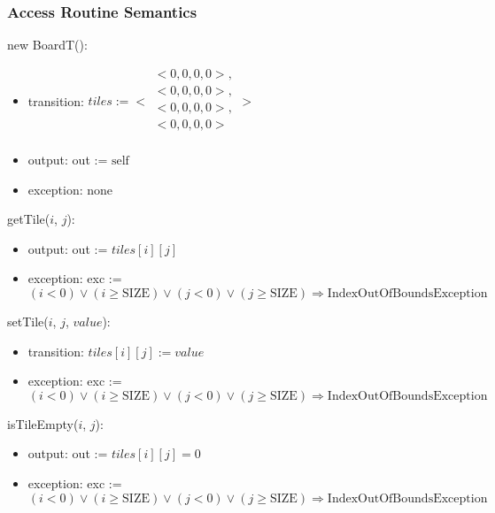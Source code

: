 \documentclass[12pt]{article}
\begin{document}
\newpage

\subsubsection* {Access Routine Semantics}

\noindent new BoardT():
\begin{itemize}
\item transition: 
$ tiles :=
< \begin{array}{lr}
< \mbox{0}, \mbox{0}, \mbox{0}, \mbox{0} >,\\
< \mbox{0}, \mbox{0}, \mbox{0}, \mbox{0} >, \\
< \mbox{0}, \mbox{0}, \mbox{0}, \mbox{0} >, \\
< \mbox{0}, \mbox{0}, \mbox{0}, \mbox{0} >\\
\end{array} >
$

\item output: out := $\mbox{self}$
\item exception: none
\end{itemize}

\noindent getTile($i$, $j$):
\begin{itemize}
\item output: out := $tiles[i][j]$
\item exception: exc := $(\mathit{i} < 0) \vee (\mathit{i} \geq \text{SIZE}) \vee (\mathit{j} < 0) \vee (\mathit{j} \geq \text{SIZE})\Rightarrow \text{IndexOutOfBoundsException}$
\end{itemize}

\noindent setTile($i$, $j$, $value$):
\begin{itemize}
\item transition: $tiles[i][j] := value$
\item exception: exc := $(\mathit{i} < 0) \vee (\mathit{i} \geq \text{SIZE}) \vee (\mathit{j} < 0) \vee (\mathit{j} \geq \text{SIZE})\Rightarrow \text{IndexOutOfBoundsException}$
\end{itemize}

\noindent isTileEmpty($i$, $j$):
\begin{itemize}
\item output: out := $tiles[i][j] = 0$
\item exception: exc := $(\mathit{i} < 0) \vee (\mathit{i} \geq \text{SIZE}) \vee (\mathit{j} < 0) \vee (\mathit{j} \geq \text{SIZE})\Rightarrow \text{IndexOutOfBoundsException}$
\end{itemize}
\end{document}
